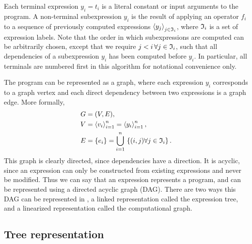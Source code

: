 Each terminal expression $y_i = t_i$ is a literal constant or input
arguments to the program.  A non-terminal subexpression $y_i$ is the
result of applying an operator $f_i$ to a sequence of previously
computed expressions $\left\langle{y_j}\right\rangle_{j\in\mathfrak{I}_i}$, where $\mathfrak{I}_i$ is a set
of expression labels.  Note that the order in which subexpressions are
computed can be arbitrarily chosen, except that we require $j < i \,
\forall j \in \mathfrak{I}_i$, such that all dependencies of a subexpression
$y_i$ has been computed before $y_i$.  In particular, all terminals
are numbered first in this algorithm for notational convenience only.

The program can be represented as a graph, where each expression $y_i$
corresponds to a graph vertex and each direct dependency between two
expressions is a graph edge. More formally,
\begin{align}
G &= (V, E), \label{ufl:eq:G} \\
V &= \left\langle{v_i}\right\rangle_{i=1}^n = \left\langle{y_i}\right\rangle_{i=1}^n, \label{ufl:eq:V} \\
E &= \{ e_i \} = \bigcup_{i=1}^n \, \left\{ (i, j) \forall j \in \mathfrak{I}_i \right\} . \label{ufl:eq:E}
\end{align}
This graph is clearly directed, since dependencies have a direction.
It is acyclic, since an expression can only be constructed from
existing expressions and never be modified.  Thus we can say that an
\ufl{} expression represents a program, and can be represented using a
directed acyclic graph (DAG).  There are two ways this DAG can be
represented in \ufl{}, a linked representation called the expression
tree, and a linearized representation called the computational graph.

\subsection{Tree representation}

